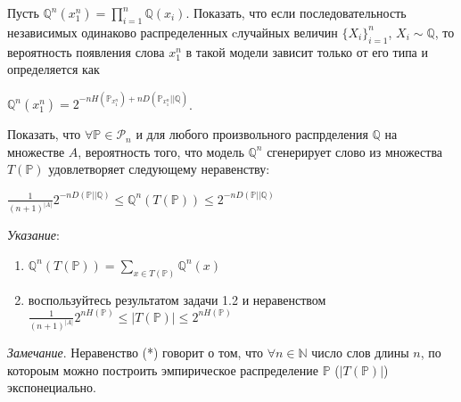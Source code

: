 \begin{problem}
Пусть $\mathbb{Q}^n(x_1^n) = \prod_{i = 1}^{n} \mathbb{Q}(x_i)$. Показать, что если последовательность независимых одинаково распределенных cлучайных величин $\{X_i\}_{i = 1}^n$, $X_i \sim \mathbb{Q}$, то вероятность появления слова $x_1^n$ в такой модели зависит только от его типа и определяется как
\begin{center}
$\mathbb{Q}^n(x_1^n) = 2^{-nH(\mathbb{P}_{x_1^n}) + nD(\mathbb{P}_{x_1^n}||\mathbb{Q})}$.
\end{center}   
\end{problem}

\begin{problem}
Показать, что $\forall \mathbb{P} \in \mathcal{P}_n$ и для любого произвольного распрделения $\mathbb{Q}$ на множестве $A$, вероятность того, что модель $\mathbb{Q}^n$ сгенерирует слово из множества $T(\mathbb{P})$ удовлетворяет следующему неравенству:
\begin{center}
$\frac{1}{(n+1)^{|A|}} 2^{-nD(\mathbb{P}||\mathbb{Q})} \leq \mathbb{Q}^n(T(\mathbb{P})) \leq 2^{-nD(\mathbb{P}||\mathbb{Q})}$
\end{center}
\emph{Указание}:
\begin{enumerate}
\item $\mathbb{Q}^n(T(\mathbb{P})) = \sum_{x \in T(\mathbb{P})} \mathbb{Q}^n(x)$
\item воспользуйтесь результатом задачи 1.2 и неравенством \\
$\frac{1}{(n+1)^{|A|}} 2^{nH(\mathbb{P})} \leq |T(\mathbb{P})| \leq 2^{nH(\mathbb{P})} $
\end{enumerate}
\textit{Замечание}. Неравенство (*) говорит о том, что $\forall n \in \mathbb{N}$ число слов длины $n$, по котороым можно построить эмпирическое распределение $\mathbb{P}$ ($|T(\mathbb{P})|$) экспонециально.
\end{problem}


